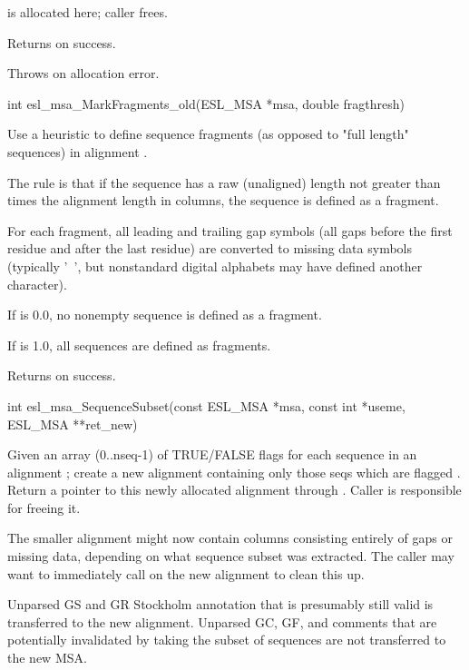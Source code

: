 \begin{sreapi}
 is allocated here; caller frees.

Returns  on success.

Throws  on allocation error.



\hypertarget{func:esl_msa_MarkFragments_old()}
{\item[int esl\_msa\_MarkFragments\_old(ESL\_MSA *msa, double fragthresh)]}

Use a heuristic to define sequence fragments (as opposed
to "full length" sequences) in alignment .

The rule is that if the sequence has a raw (unaligned)
length not greater than  times the alignment
length in columns, the sequence is defined as a fragment.

For each fragment, all leading and trailing gap symbols
(all gaps before the first residue and after the last
residue) are converted to missing data symbols
(typically '~', but nonstandard digital alphabets may
have defined another character).

If  is 0.0, no nonempty sequence is defined
as a fragment.

If  is 1.0, all sequences are defined as
fragments.

Returns  on success.


\hypertarget{func:esl_msa_SequenceSubset()}
{\item[int esl\_msa\_SequenceSubset(const ESL\_MSA *msa, const int *useme, ESL\_MSA **ret\_new)]}

Given an array  (0..nseq-1) of TRUE/FALSE flags for each
sequence in an alignment ; create a new alignment containing
only those seqs which are flagged . Return a pointer
to this newly allocated alignment through . Caller is
responsible for freeing it.

The smaller alignment might now contain columns
consisting entirely of gaps or missing data, depending
on what sequence subset was extracted. The caller may
want to immediately call  on the
new alignment to clean this up.

Unparsed GS and GR Stockholm annotation that is presumably still
valid is transferred to the new alignment. Unparsed GC, GF, and
comments that are potentially invalidated by taking the subset
of sequences are not transferred to the new MSA.


\end{sreapi}
